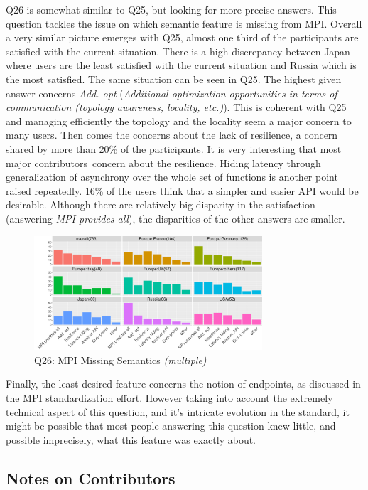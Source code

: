 \documentclass[preprint,5p,times]{elsarticle}
\def\myquote#1{{\it #1}}
\def\Countries{Contributors}%
\def\mcountries{major contributors\xspace{}}%
\begin{document}
Q26 is somewhat similar to Q25, but looking for more precise answers.
This question tackles the issue on which semantic feature is missing
from MPI. Overall a very similar picture emerges with Q25, almost one
third of the participants are satisfied with the current
situation. There is a high discrepancy between Japan where users are
the least satisfied with the current situation and Russia which is
the most satisfied. The same situation can be seen in Q25. The highest
given answer concerns \myquote{Add. opt} (\myquote{Additional
  optimization opportunities in terms of communication (topology
  awareness, locality, etc.)}). This is coherent with Q25 and managing
efficiently the topology and the locality seem a major concern to many
users. Then
comes the concerns about the lack of resilience, a concern shared by
more than 20\% of the participants. It is very interesting that most
\mcountries\  concern about the resilience. Hiding latency through
generalization of asynchrony over the whole set of functions is
another point raised repeatedly. 16\% of the users think that a
simpler and easier API would be desirable.
Although there are relatively big disparity in the satisfaction
(answering \myquote{MPI provides all}), the disparities of the other
answers are smaller.

\begin{figure}[htb]
\begin{center}
\includegraphics[width=8.5cm]{R-scripts/Q26.pdf}
\caption{Q26: MPI Missing Semantics {\it(multiple)}}
\label{fig:missing-semantics}
\end{center}
\end{figure}

Finally, the least desired feature concerns the notion of endpoints,
as discussed in the MPI standardization effort. However taking into
account the extremely
technical aspect of this question, and it's intricate evolution in the
standard, it might be possible that most people answering this
question knew little, and possible imprecisely, what this feature was
exactly about.

\subsection{Notes on \Countries}
\end{document}
